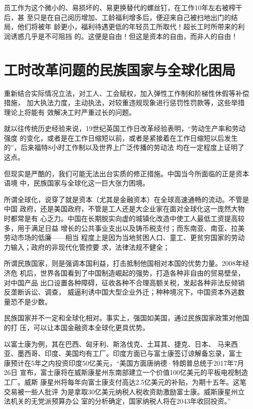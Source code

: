 
员工作为这个微小的、易损坏的、易更换替代的螺丝钉，在工作10年左右被榨干后，甚
至只是在自己阅历增加、工龄福利增多后，便迎来自己被扫地出门的结局，他们将被年
龄更小，福利待遇更低的年轻员工所取代！超长工时所带来的利润诱惑几乎是不可阻挡
的。这便是自由！但这是资本的自由，而非人的自由！

\section{工时改革问题的民族国家与全球化困局}

重新结合实际情况立法，对工人、工会赋权，加入弹性工作制和阶梯性休假等补偿措施，
加大执法力度，主动执法，对较重违规现象进行惩罚性罚款等，这些举措理论上将能有
效解决工时严重过长的问题。

就以往传统历史经验来说，19世纪英国工作日改革经验表明，“劳动生产率和劳动强度
的变化，或者是在工作日缩短以前，或者是紧接着在工作日缩短以后发生
的”\cite[601]{capital}，后来福特8小时工作制以及世界上广泛传播的劳动法
均在一定程度上证明了这点。

但现实是严酷的，我们可能无法出台实质的修正措施。中国当今所面临的正是资本语境
中，民族国家与全球化这一巨大张力困境。

所谓全球化，说穿了就是资本（尤其是金融资本）在全球高速通畅的流动。不管是中国
政府，还是美国政府，不管是工人还是大企业家在面对全球化这一庞然大物时都常是有
心乏力。中国在长期脱实向虚的城镇化改造中使工人最低工资提高较多，用于满足日益
增长的公共事业支出以及铸币税支付；而东南亚、南亚、拉美劳动市场的低廉——相当
程度上是因为当地贫困人口、童工、更贫穷国家的劳动力输入；政府的非现代化管控要
求，法律法规不健全；

所谓民族国家，则是强调本国利益，打击抵制他国相对本国的优势力量。2008年经济危
机后，世界各国看到了中国制造崛起的强势，打造各种非自由的贸易壁垒，对中国产品
出口设置各种障碍，征收各种不合理高额关税，发起各种非法反倾销反垄断诉讼、调查，
威逼利诱中国大型企业外迁；种种境况下，中国资本外逃数量恐不是少数。

民族国家并不一定和全球化相对。事实上，强国如美国，通过民族国家政策对他国的打
压，可以让本国金融资本全球化更具优势。


以富士康\cite{foxconnwiki}为例，其在巴西、匈牙利、斯洛伐克、土耳其、捷克、日本、
马来西亚、墨西哥、印度、美国均有工厂。印度方面已与富士康签订谅解备忘录，富士
康预计在5年之内投资印度50亿美元，“美国方面唐纳德·特朗普总统于2017年7月26日
宣布，富士康将在威斯康星州东南部建立一个价值100亿美元的平板电视制造工厂。威斯
康星州将每年向富士康支付高达2.5亿美元的补贴，为期十五年。这笔交易被一些人批评
为是拿取30亿美元纳税人税收资助激励富士康。威斯康星州立法机关的无党派预算办公
室的分析确定，国家纳税人将在2043年收回投资。”

